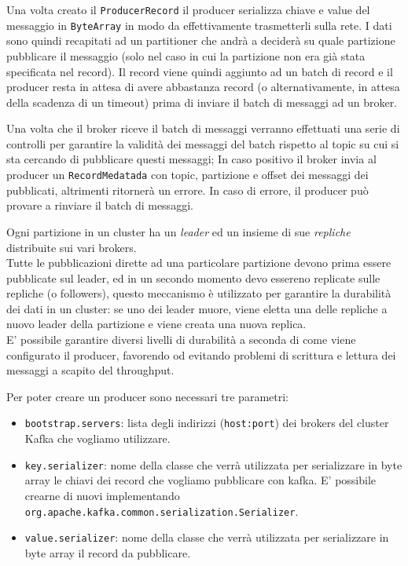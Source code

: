 \documentclass[]{article}
\providecommand{\tightlist}{%
  \setlength{\itemsep}{0pt}\setlength{\parskip}{0pt}}
\begin{document}
Una volta creato il \texttt{ProducerRecord} il producer serializza
chiave e value del messaggio in \texttt{ByteArray} in modo da
effettivamente trasmetterli sulla rete. I dati sono quindi recapitati ad
un partitioner che andrà a deciderà su quale partizione pubblicare il
messaggio (solo nel caso in cui la partizione non era già stata
specificata nel record). Il record viene quindi aggiunto ad un batch di
record e il producer resta in attesa di avere abbastanza record (o
alternativamente, in attesa della scadenza di un timeout) prima di
inviare il batch di messaggi ad un broker.

Una volta che il broker riceve il batch di messaggi verranno effettuati
una serie di controlli per garantire la validità dei messaggi del batch
rispetto al topic su cui si sta cercando di pubblicare questi messaggi;
In caso positivo il broker invia al producer un \texttt{RecordMedatada}
con topic, partizione e offset dei messaggi dei pubblicati, altrimenti
ritornerà un errore. In caso di errore, il producer può provare a
rinviare il batch di messaggi.

Ogni partizione in un cluster ha un \emph{leader} ed un insieme di sue
\emph{repliche} distribuite sui vari brokers.\\
Tutte le pubblicazioni dirette ad una particolare partizione devono
prima essere pubblicate sul leader, ed in un secondo momento devo
essereno replicate sulle repliche (o followers), questo meccanismo è
utilizzato per garantire la durabilità dei dati in un cluster: se uno
dei leader muore, viene eletta una delle repliche a nuovo leader della
partizione e viene creata una nuova replica.\\
E' possibile garantire diversi livelli di durabilità a seconda di come
viene configurato il producer, favorendo od evitando problemi di
scrittura e lettura dei messaggi a scapito del throughput.

\newpage

Per poter creare un producer sono necessari tre parametri:

\begin{itemize}
\tightlist
\item
  \texttt{bootstrap.servers}: lista degli indirizzi (\texttt{host:port})
  dei brokers del cluster Kafka che vogliamo utilizzare.
\item
  \texttt{key.serializer}: nome della classe che verrà utilizzata per
  serializzare in byte array le chiavi dei record che vogliamo
  pubblicare con kafka. E' possibile crearne di nuovi implementando
  \texttt{org.apache.kafka.common.serialization.Serializer}.
\item
  \texttt{value.serializer}: nome della classe che verrà utilizzata per
  serializzare in byte array il record da pubblicare.
\end{itemize}
\end{document}
